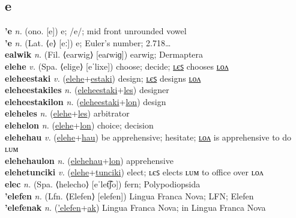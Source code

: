 \subsection{e}

\textbf{'e} \textit{n.} (ono. [e])
e; /e/; mid front unrounded vowel \label{'e} \\
\textbf{'e} \textit{n.} (Lat. ⟨e⟩ [eː])
e; Euler's number; 2.718… \label{'e} \\
\textbf{ealwik} \textit{n.} (Fil. ⟨earwig⟩ [eaɾwiɡ])
earwig; Dermaptera \label{ealwik} \\
\textbf{elehe} \textit{v.} (Spa. ⟨elige⟩ [eˈlixe])
choose; decide; \hyperref[eleheles]{ʟєꜱ} chooses \hyperref[elehelon]{ʟᴏᴧ} \label{elehe} \\
\textbf{eleheestaki} \textit{v.} (\hyperref[elehe]{elehe}+\hyperref[estaki]{estaki})
design; \hyperref[eleheestakiles]{ʟєꜱ} designs \hyperref[eleheestakilon]{ʟᴏᴧ} \label{eleheestaki} \\
\textbf{eleheestakiles} \textit{n.} (\hyperref[eleheestaki]{eleheestaki}+\hyperref[les]{les})
designer \label{eleheestakiles} \\
\textbf{eleheestakilon} \textit{n.} (\hyperref[eleheestaki]{eleheestaki}+\hyperref[lon]{lon})
design \label{eleheestakilon} \\
\textbf{eleheles} \textit{n.} (\hyperref[elehe]{elehe}+\hyperref[les]{les})
arbitrator \label{eleheles} \\
\textbf{elehelon} \textit{n.} (\hyperref[elehe]{elehe}+\hyperref[lon]{lon})
choice; decision \label{elehelon} \\
\textbf{elehehau} \textit{v.} (\hyperref[elehe]{elehe}+\hyperref[hau]{hau})
be apprehensive; hesitate; \hyperref[elehehaulon]{ʟᴏᴧ} is apprehensive to do ʟᴜᴍ \label{elehehau} \\
\textbf{elehehaulon} \textit{n.} (\hyperref[elehehau]{elehehau}+\hyperref[lon]{lon})
apprehensive \label{elehehaulon} \\
\textbf{elehetunciki} \textit{v.} (\hyperref[elehe]{elehe}+\hyperref[tunciki]{tunciki})
elect; ʟєꜱ elects ʟᴜᴍ to office over ʟᴏᴧ \label{elehetunciki} \\
\textbf{elec} \textit{n.} (Spa. ⟨helecho⟩ [eˈlet͡ʃo])
fern; Polypodiopsida \label{elec} \\
\textbf{'elefen} \textit{n.} (Lfn. ⟨Elefen⟩ [elefen])
Lingua Franca Nova; LFN; Elefen \label{'elefen} \\
\textbf{'elefenak} \textit{n.} (\hyperref['elefen]{'elefen}+\hyperref[ak]{ak})
Lingua Franca Nova; in Lingua Franca Nova \label{'elefenak} \\
